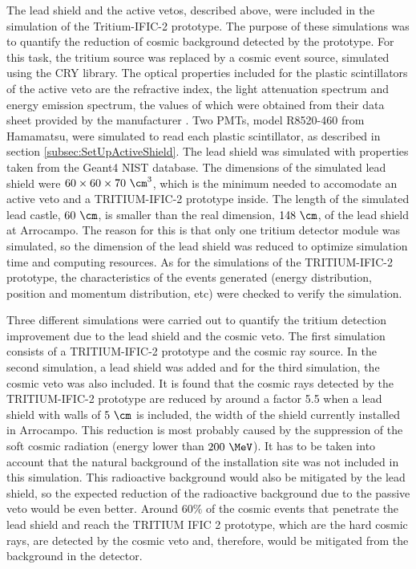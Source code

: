 The lead shield and the active vetos, described above, were included in the simulation of the Tritium-IFIC-2 prototype. The purpose of these simulations was to quantify the reduction of cosmic background detected by the prototype. For this task, the tritium source was replaced by a cosmic event source, simulated using the CRY library. The optical properties included for the plastic scintillators of the active veto are the refractive index, the light attenuation spectrum and energy emission spectrum, the values of which were obtained from their data sheet provided by the manufacturer \cite{ScintillatorVeto}. Two PMTs, model R8520-460 from Hamamatsu, were simulated to read each plastic scintillator, as described in section \ref{subsec:SetUpActiveShield}. The lead shield was simulated with properties taken from the Geant4 NIST database. The dimensions of the simulated lead shield were $60 \times 60 \times 70~\cm^3$, which is the minimum needed to accomodate an active veto and a TRITIUM-IFIC-2 prototype inside. The length of the simulated lead castle, $60~\cm$, is smaller than the real dimension, $148~\cm$, of the lead shield at Arrocampo. The reason for this is that only one tritium detector module was simulated, so the dimension of the lead shield was reduced to optimize simulation time and computing resources. As for the simulations of the TRITIUM-IFIC-2 prototype, the characteristics of the events generated (energy distribution, position and momentum distribution, etc) were checked to verify the simulation.

Three different simulations were carried out to quantify the tritium detection improvement due to the lead shield and the cosmic veto. The first simulation consists of a TRITIUM-IFIC-2 prototype and the cosmic ray source. In the second simulation, a lead shield was added and for the third simulation, the cosmic veto was also included. It is found that the cosmic rays detected by the TRITIUM-IFIC-2 prototype are reduced by around a factor 5.5 when a lead shield with walls of $5~\cm$ is included, the width of the shield currently installed in Arrocampo. This reduction is most probably caused by the suppression of the soft cosmic radiation (energy lower than $200~\MeV$). It has to be taken into account that the natural background of the installation site was not included in this simulation. This radioactive background would also be mitigated by the lead shield, so the expected reduction of the radioactive background due to the passive veto would be even better. Around $60\%$ of the cosmic events that penetrate the lead shield and reach the TRITIUM IFIC 2 prototype, which are the hard cosmic rays, are detected by the cosmic veto and, therefore, would be mitigated from the background in the detector.